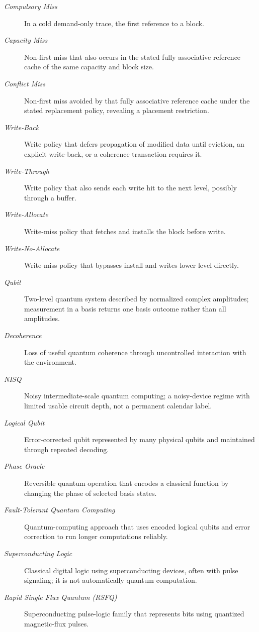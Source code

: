 \begin{description}
    \item[\textit{Compulsory Miss}] In a cold demand-only trace, the first reference to a block.
    \item[\textit{Capacity Miss}] Non-first miss that also occurs in the stated fully associative reference cache of the same capacity and block size.
    \item[\textit{Conflict Miss}] Non-first miss avoided by that fully associative reference cache under the stated replacement policy, revealing a placement restriction.
    \item[\textit{Write-Back}] Write policy that defers propagation of modified data until eviction, an explicit write-back, or a coherence transaction requires it.
    \item[\textit{Write-Through}] Write policy that also sends each write hit to the next level, possibly through a buffer.
    \item[\textit{Write-Allocate}] Write-miss policy that fetches and installs the block before write.
    \item[\textit{Write-No-Allocate}] Write-miss policy that bypasses install and writes lower level directly.
    \item[\textit{Qubit}] Two-level quantum system described by normalized complex amplitudes; measurement in a basis returns one basis outcome rather than all amplitudes.
    \item[\textit{Decoherence}] Loss of useful quantum coherence through uncontrolled interaction with the environment.
    \item[\textit{NISQ}] Noisy intermediate-scale quantum computing; a noisy-device regime with limited usable circuit depth, not a permanent calendar label.
    \item[\textit{Logical Qubit}] Error-corrected qubit represented by many physical qubits and maintained through repeated decoding.
    \item[\textit{Phase Oracle}] Reversible quantum operation that encodes a classical function by changing the phase of selected basis states.
    \item[\textit{Fault-Tolerant Quantum Computing}] Quantum-computing approach that uses encoded logical qubits and error correction to run longer computations reliably.
    \item[\textit{Superconducting Logic}] Classical digital logic using superconducting devices, often with pulse signaling; it is not automatically quantum computation.
    \item[\textit{Rapid Single Flux Quantum (RSFQ)}] Superconducting pulse-logic family that represents bits using quantized magnetic-flux pulses.

\end{description}
